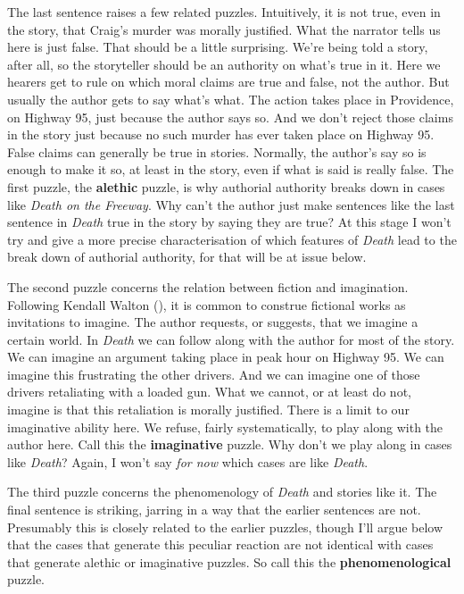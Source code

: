\documentclass[
  10pt,
  letterpaper,
  DIV=11,
  numbers=noendperiod,
  twoside]{scrartcl}
\begin{document}
The last sentence raises a few related puzzles. Intuitively, it is not
true, even in the story, that Craig's murder was morally justified. What
the narrator tells us here is just false. That should be a little
surprising. We're being told a story, after all, so the storyteller
should be an authority on what's true in it. Here we hearers get to rule
on which moral claims are true and false, not the author. But usually
the author gets to say what's what. The action takes place in
Providence, on Highway 95, just because the author says so. And we don't
reject those claims in the story just because no such murder has ever
taken place on Highway 95. False claims can generally be true in
stories. Normally, the author's say so is enough to make it so, at least
in the story, even if what is said is really false. The first puzzle,
the \textbf{alethic} puzzle, is why authorial authority breaks down in
cases like \emph{Death on the Freeway}. Why can't the author just make
sentences like the last sentence in \emph{Death} true in the story by
saying they are true? At this stage I won't try and give a more precise
characterisation of which features of \emph{Death} lead to the break
down of authorial authority, for that will be at issue below.

The second puzzle concerns the relation between fiction and imagination.
Following Kendall Walton (), it is common
to construe fictional works as invitations to imagine. The author
requests, or suggests, that we imagine a certain world. In \emph{Death}
we can follow along with the author for most of the story. We can
imagine an argument taking place in peak hour on Highway 95. We can
imagine this frustrating the other drivers. And we can imagine one of
those drivers retaliating with a loaded gun. What we cannot, or at least
do not, imagine is that this retaliation is morally justified. There is
a limit to our imaginative ability here. We refuse, fairly
systematically, to play along with the author here. Call this the
\textbf{imaginative} puzzle. Why don't we play along in cases like
\emph{Death}? Again, I won't say \emph{for now} which cases are like
\emph{Death}.

The third puzzle concerns the phenomenology of \emph{Death} and stories
like it. The final sentence is striking, jarring in a way that the
earlier sentences are not. Presumably this is closely related to the
earlier puzzles, though I'll argue below that the cases that generate
this peculiar reaction are not identical with cases that generate
alethic or imaginative puzzles. So call this the
\textbf{phenomenological} puzzle.
\end{document}
